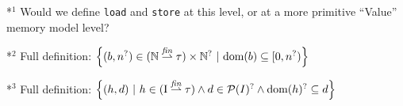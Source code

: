 \documentclass[,a4paper,oneside]{article}
\newcommand{\code}[1]{\texttt{#1}}
\newcommand{\itl}[1]{{\it#1}}
\newcommand{\finmap}{\stackrel{\itl{fin}}\rightharpoonup}
\newcommand{\pset}{{\cal P}}
\newcommand{\idx}[1]{${}^{#1}$}
\begin{document}
\vspace{1cm}
*\idx1 Would we define \code{load} and \code{store} at this level, or at a more primitive ``Value'' memory model level?

*\idx2 Full definition: $\left\{ (b, n^?) \in (\mathbb N \finmap \tau) \times \mathbb N^? ~|~ \text{dom}(b) \subseteq [0, n^?)  \right\}$

*\idx3 Full definition: $\left\{ (h,d) ~|~ h\in (\text{I} \finmap \tau )\land d\in\pset(I)^?\land\text{dom}(h)^?\subseteq d\right\}$
\end{document}
